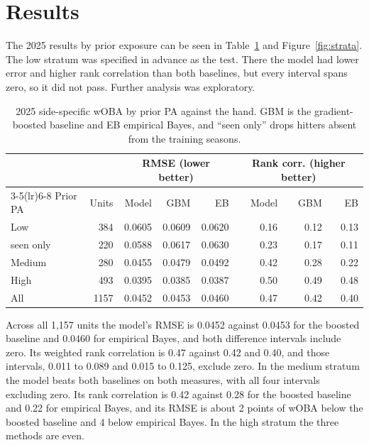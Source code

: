 \section{Results}
\label{sec:results}
\label{sec:test}

The 2025 results by prior exposure can be seen in Table~\ref{tab:test} and Figure~\ref{fig:strata}. The low stratum was specified in advance as the test. There the model had lower error and higher rank correlation than both baselines, but every interval spans zero, so it did not pass. Further analysis was exploratory.

\begin{table}[!ht]
\centering\small
\begin{tabular}{lrrrrrrr}
\toprule
 & & \multicolumn{3}{c}{RMSE (lower better)} & \multicolumn{3}{c}{Rank corr. (higher better)} \\
\cmidrule(lr){3-5}\cmidrule(lr){6-8}
Prior PA & Units & Model & GBM & EB & Model & GBM & EB \\
\midrule
Low & 384 & 0.0605 & 0.0609 & 0.0620 & 0.16 & 0.12 & 0.13 \\
\quad seen only & 220 & 0.0588 & 0.0617 & 0.0630 & 0.23 & 0.17 & 0.11 \\
Medium & 280 & 0.0455 & 0.0479 & 0.0492 & 0.42 & 0.28 & 0.22 \\
High & 493 & 0.0395 & 0.0385 & 0.0387 & 0.50 & 0.49 & 0.48 \\
All & 1157 & 0.0452 & 0.0453 & 0.0460 & 0.47 & 0.42 & 0.40 \\\bottomrule
\end{tabular}
\caption{2025 side-specific wOBA by prior PA against the hand. GBM is the gradient-boosted baseline and EB empirical Bayes, and ``seen only'' drops hitters absent from the training seasons.}
\label{tab:test}
\end{table}

Across all 1,157 units the model's RMSE is 0.0452 against 0.0453 for the boosted baseline and 0.0460 for empirical Bayes, and both difference intervals include zero. Its weighted rank correlation is 0.47 against 0.42 and 0.40, and those intervals, 0.011 to 0.089 and 0.015 to 0.125, exclude zero. In the medium stratum the model beats both baselines on both measures, with all four intervals excluding zero. Its rank correlation is 0.42 against 0.28 for the boosted baseline and 0.22 for empirical Bayes, and its RMSE is about 2 points of wOBA below the boosted baseline and 4 below empirical Bayes. In the high stratum the three methods are even.

